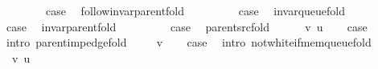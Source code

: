 \begin{isabellebody}
\ \ \isamarkupfalse%
\ {}\isanewline
\ \ \isamarkupfalse%
\ {\isacharquery}{\kern0pt}case\ \isamarkupfalse%
\ follow{\isacharunderscore}{\kern0pt}invar{\isacharunderscore}{\kern0pt}parent{\isacharunderscore}{\kern0pt}fold\ \isacommand{{\isachardot}{\kern0pt}}\isamarkupfalse%
\isanewline
{}\isamarkupfalse%
\isanewline
\ \ \isamarkupfalse%
\ {}\isanewline
\ \ \isamarkupfalse%
\ {\isacharquery}{\kern0pt}case\ \isamarkupfalse%
\ invar{\isacharunderscore}{\kern0pt}queue{\isacharunderscore}{\kern0pt}fold\ \isacommand{{\isachardot}{\kern0pt}}\isamarkupfalse%
\isanewline
{}\isamarkupfalse%
\isanewline
\ \ \isamarkupfalse%
\ {}\isanewline
\ \ \isamarkupfalse%
\ {\isacharquery}{\kern0pt}case\ \isamarkupfalse%
\ invar{\isacharunderscore}{\kern0pt}parent{\isacharunderscore}{\kern0pt}fold\ \isacommand{{\isachardot}{\kern0pt}}\isamarkupfalse%
\isanewline
{}\isamarkupfalse%
\isanewline
\ \ \isamarkupfalse%
\ {}\isanewline
\ \ \isamarkupfalse%
\ {\isacharquery}{\kern0pt}case\ \isamarkupfalse%
\ parent{\isacharunderscore}{\kern0pt}src{\isacharunderscore}{\kern0pt}fold\ \isacommand{{\isachardot}{\kern0pt}}\isamarkupfalse%
\isanewline
{}\isamarkupfalse%
\isanewline
\ \ \isamarkupfalse%
\ {\isacharparenleft}{\kern0pt}{}\ v\ u{\isacharparenright}{\kern0pt}\isanewline
\ \ \isamarkupfalse%
\ {\isacharquery}{\kern0pt}case\ \isamarkupfalse%
\ {\isacharparenleft}{\kern0pt}intro\ parent{\isacharunderscore}{\kern0pt}imp{\isacharunderscore}{\kern0pt}edge{\isacharunderscore}{\kern0pt}fold{\isacharparenright}{\kern0pt}\isanewline
{}\isamarkupfalse%
\isanewline
\ \ \isamarkupfalse%
\ {\isacharparenleft}{\kern0pt}{}\ v{\isacharparenright}{\kern0pt}\isanewline
\ \ \isamarkupfalse%
\ {\isacharquery}{\kern0pt}case\ \isamarkupfalse%
\ {\isacharparenleft}{\kern0pt}intro\ not{\isacharunderscore}{\kern0pt}white{\isacharunderscore}{\kern0pt}if{\isacharunderscore}{\kern0pt}mem{\isacharunderscore}{\kern0pt}queue{\isacharunderscore}{\kern0pt}fold{\isacharparenright}{\kern0pt}\isanewline
{}\isamarkupfalse%
\isanewline
\ \ \isamarkupfalse%
\ {\isacharparenleft}{\kern0pt}{}\ v\ u{\isacharparenright}{\kern0pt}\isanewline

\end{isabellebody}
